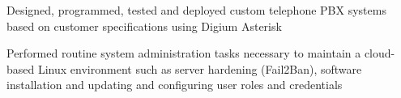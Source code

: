 \documentclass[letterpaper]{deedy-resume} %
\begin{document}
\begin{minipage}[t]{0.66\textwidth}
\begin{tightitemize}
	\item Designed, programmed, tested and deployed custom telephone PBX systems based on customer specifications using Digium Asterisk
	\item Performed routine system administration tasks necessary to maintain a cloud-based Linux environment such as server hardening (Fail2Ban), software installation and updating and configuring user roles and credentials 
\end{tightitemize}





\end{minipage} %








\end{document}
